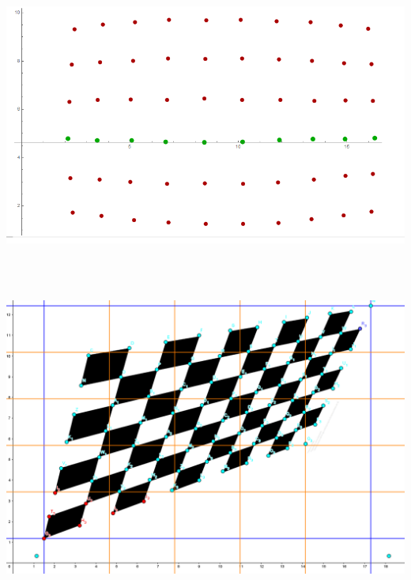 \begin{minipage}{\linewidth}
	\centering
	\includegraphics[width=1\linewidth]{images/AlgTonnenverzeichnung.png}
\end{minipage}\\\\

\begin{minipage}{\linewidth}
	\centering
	\includegraphics[width=1\linewidth]{images/perspektivisch.png}
\end{minipage}\\

